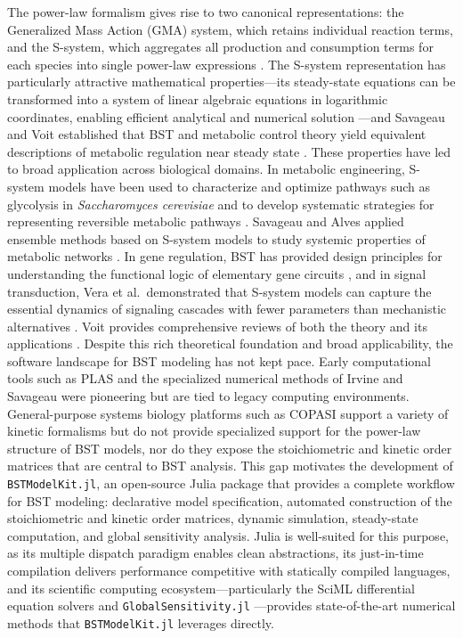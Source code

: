 \documentclass[11pt]{article}
\begin{document}
The power-law formalism gives rise to two canonical representations: the Generalized Mass Action (GMA) system, which retains individual reaction terms, and the S-system, which aggregates all production and consumption terms for each species into single power-law expressions \citep{Savageau1987}. The S-system representation has particularly attractive mathematical properties---its steady-state equations can be transformed into a system of linear algebraic equations in logarithmic coordinates, enabling efficient analytical and numerical solution \citep{Savageau1976,Voit2000}---and Savageau and Voit established that BST and metabolic control theory yield equivalent descriptions of metabolic regulation near steady state \citep{Savageau1987}. These properties have led to broad application across biological domains. In metabolic engineering, S-system models have been used to characterize and optimize pathways such as glycolysis in \textit{Saccharomyces cerevisiae} \citep{Cascante1995} and to develop systematic strategies for representing reversible metabolic pathways \citep{Sorribas1989}. Savageau and Alves applied ensemble methods based on S-system models to study systemic properties of metabolic networks \citep{Alves2000}. In gene regulation, BST has provided design principles for understanding the functional logic of elementary gene circuits \citep{Savageau2001}, and in signal transduction, Vera et al.\ demonstrated that S-system models can capture the essential dynamics of signaling cascades with fewer parameters than mechanistic alternatives \citep{Vera2007}. Voit provides comprehensive reviews of both the theory and its applications \citep{Voit2000,Torres2002,Voit2013,Voit2013review}. Despite this rich theoretical foundation and broad applicability, the software landscape for BST modeling has not kept pace. Early computational tools such as PLAS \citep{Voit2000} and the specialized numerical methods of Irvine and Savageau \citep{Irvine1990} were pioneering but are tied to legacy computing environments. General-purpose systems biology platforms such as COPASI \citep{Hoops2006} support a variety of kinetic formalisms but do not provide specialized support for the power-law structure of BST models, nor do they expose the stoichiometric and kinetic order matrices that are central to BST analysis. This gap motivates the development of \texttt{BSTModelKit.jl}, an open-source Julia \citep{Bezanson2017} package that provides a complete workflow for BST modeling: declarative model specification, automated construction of the stoichiometric and kinetic order matrices, dynamic simulation, steady-state computation, and global sensitivity analysis. Julia is well-suited for this purpose, as its multiple dispatch paradigm enables clean abstractions, its just-in-time compilation delivers performance competitive with statically compiled languages, and its scientific computing ecosystem---particularly the SciML differential equation solvers \citep{Rackauckas2017} and \texttt{GlobalSensitivity.jl} \citep{Dixit2022}---provides state-of-the-art numerical methods that \texttt{BSTModelKit.jl} leverages directly.
\end{document}
